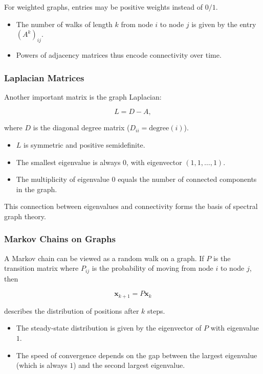 \documentclass[
  12pt,
  a4paper,
]{article}
\begin{document}
For weighted graphs, entries may be positive weights instead of \(0/1\).

\begin{itemize}
\item
  The number of walks of length \(k\) from node \(i\) to node \(j\) is
  given by the entry \((A^k)_{ij}\).
\item
  Powers of adjacency matrices thus encode connectivity over time.
\end{itemize}

\subsubsection{Laplacian Matrices}\label{laplacian-matrices}

Another important matrix is the graph Laplacian:

\[L = D - A,\]

where \(D\) is the diagonal degree matrix
(\(D_{ii} = \text{degree}(i)\)).

\begin{itemize}
\item
  \(L\) is symmetric and positive semidefinite.
\item
  The smallest eigenvalue is always \(0\), with eigenvector
  \((1,1,\dots,1)\).
\item
  The multiplicity of eigenvalue \(0\) equals the number of connected
  components in the graph.
\end{itemize}

This connection between eigenvalues and connectivity forms the basis of
spectral graph theory.

\subsubsection{Markov Chains on Graphs}\label{markov-chains-on-graphs}

A Markov chain can be viewed as a random walk on a graph. If \(P\) is
the transition matrix where \(P_{ij}\) is the probability of moving from
node \(i\) to node \(j\), then

\[\mathbf{x}_{k+1} = P \mathbf{x}_k\]

describes the distribution of positions after \(k\) steps.

\begin{itemize}
\item
  The steady-state distribution is given by the eigenvector of \(P\)
  with eigenvalue \(1\).
\item
  The speed of convergence depends on the gap between the largest
  eigenvalue (which is always \(1\)) and the second largest eigenvalue.
\end{itemize}
\end{document}
